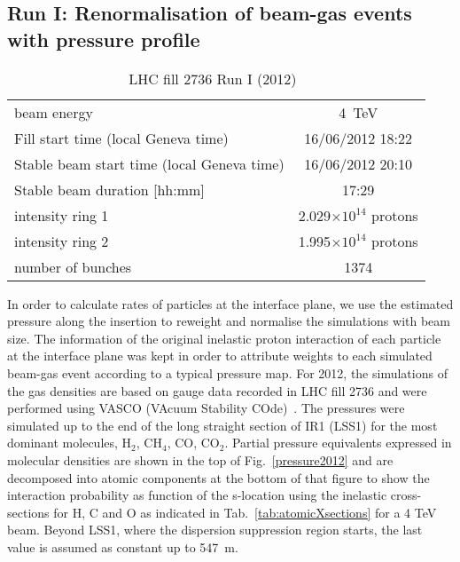 \subsection{Run I: Renormalisation of beam-gas events with pressure profile \label{BGreweighted4TeV}}

\begin{table}
   \centering
   \caption{LHC fill 2736 Run I (2012)~\cite{refAccStats}}
   \begin{tabular}{l||c}
       \hline
       beam energy  & 4~TeV \\
       Fill start time (local Geneva time) & 16/06/2012 18:22\\
       Stable beam start time (local Geneva time) & 16/06/2012 20:10\\
       Stable beam duration [hh:mm] & 17:29\\
       intensity ring 1& 2.029$\times 10^{14}$ protons\\
       intensity ring 2& 1.995$\times 10^{14}$ protons\\
       number of bunches & 1374 \\
       \hline
   \end{tabular}
   \label{tab:fillRunI}
\end{table}
In order to calculate rates of particles at the interface plane, we use the estimated pressure along the insertion to reweight and normalise the simulations with beam size.
The information of the original inelastic proton interaction of each particle at the interface plane was kept in order to attribute weights to each simulated beam-gas event according to a typical pressure map. For 2012, the simulations of the gas densities are based on gauge data recorded in LHC fill 2736 and were performed using VASCO (VAcuum Stability COde)~\cite{vascoRef}. The pressures were simulated up to the end of the long straight section of IR1 (LSS1) for the most dominant molecules, H$_2$, CH$_4$, CO, CO$_2$. Partial pressure equivalents expressed in molecular densities are shown in the top of Fig.~\ref{pressure2012} and are decomposed into atomic components at the bottom of that figure to show the interaction probability as function of the s-location using the inelastic cross-sections for H, C and O as indicated in Tab.~\ref{tab:atomicXsections} for a 4 TeV beam. Beyond LSS1, where the dispersion suppression region starts, the last value is assumed as constant up to 547~m.

